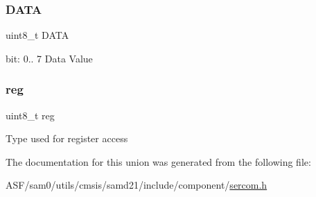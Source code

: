 \subsubsection{\texorpdfstring{DATA}{DATA}}
{\footnotesize\ttfamily uint8\+\_\+t D\+A\+TA}

bit\+: 0.. 7 Data Value \mbox{\label{union_s_e_r_c_o_m___i2_c_s___d_a_t_a___type_a9428adc9af4653a2050e2536b55dec8d}} 
\subsubsection{\texorpdfstring{reg}{reg}}
{\footnotesize\ttfamily uint8\+\_\+t reg}

Type used for register access 

The documentation for this union was generated from the following file\+:\begin{DoxyCompactItemize}
\item 
A\+S\+F/sam0/utils/cmsis/samd21/include/component/\mbox{\hyperlink{utils_2cmsis_2samd21_2include_2component_2sercom_8h}{sercom.\+h}}\end{DoxyCompactItemize}
